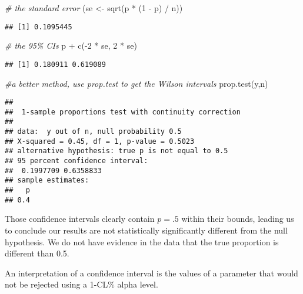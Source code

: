 \documentclass[
]{article}
\newenvironment{Shaded}{\begin{snugshade}}{\end{snugshade}}
\newcommand{\CommentTok}[1]{\textcolor[rgb]{0.56,0.35,0.01}{\textit{#1}}}
\newcommand{\DecValTok}[1]{\textcolor[rgb]{0.00,0.00,0.81}{#1}}
\newcommand{\FunctionTok}[1]{\textcolor[rgb]{0.00,0.00,0.00}{#1}}
\newcommand{\NormalTok}[1]{#1}
\newcommand{\OtherTok}[1]{\textcolor[rgb]{0.56,0.35,0.01}{#1}}
\newcommand{\SpecialCharTok}[1]{\textcolor[rgb]{0.00,0.00,0.00}{#1}}
\begin{document}
\begin{Shaded}
\begin{Highlighting}[]
\CommentTok{\# the standard error}
\NormalTok{(se }\OtherTok{\textless{}{-}} \FunctionTok{sqrt}\NormalTok{(p }\SpecialCharTok{*}\NormalTok{ (}\DecValTok{1} \SpecialCharTok{{-}}\NormalTok{ p) }\SpecialCharTok{/}\NormalTok{ n))}
\end{Highlighting}
\end{Shaded}

\begin{verbatim}
## [1] 0.1095445
\end{verbatim}

\begin{Shaded}
\begin{Highlighting}[]
\CommentTok{\# the 95\% CIs}
\NormalTok{p }\SpecialCharTok{+} \FunctionTok{c}\NormalTok{(}\SpecialCharTok{{-}}\DecValTok{2} \SpecialCharTok{*}\NormalTok{ se, }\DecValTok{2} \SpecialCharTok{*}\NormalTok{ se)}
\end{Highlighting}
\end{Shaded}

\begin{verbatim}
## [1] 0.180911 0.619089
\end{verbatim}

\begin{Shaded}
\begin{Highlighting}[]
\CommentTok{\#a better method, use prop.test to get the Wilson intervals}
\FunctionTok{prop.test}\NormalTok{(y,n)}
\end{Highlighting}
\end{Shaded}

\begin{verbatim}
## 
##  1-sample proportions test with continuity correction
## 
## data:  y out of n, null probability 0.5
## X-squared = 0.45, df = 1, p-value = 0.5023
## alternative hypothesis: true p is not equal to 0.5
## 95 percent confidence interval:
##  0.1997709 0.6358833
## sample estimates:
##   p 
## 0.4
\end{verbatim}

Those confidence intervals clearly contain \(p = .5\) within their
bounds, leading us to conclude our results are not statistically
significantly different from the null hypothesis. We do not have
evidence in the data that the true proportion is different than 0.5.

An interpretation of a confidence interval is the values of a parameter
that would not be rejected using a 1-CL\% alpha level.
\end{document}
